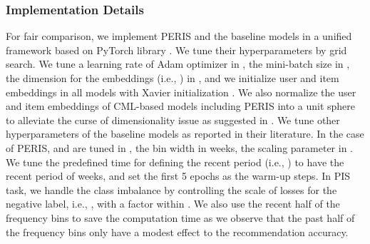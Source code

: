 \documentclass[sigconf]{acmart}
\newcommand{\MD}{{\small\textsf{PERIS}}}
\begin{document}
\subsubsection{\textbf{Implementation Details}}
For fair comparison, we implement \MD{} and the baseline models in a unified framework based on PyTorch library \cite{paszke2019pytorch}. We tune their hyperparameters by grid search. We tune a learning rate of Adam optimizer \cite{kingma2014adam} in , the mini-batch size in , the dimension for the embeddings (i.e., ) in , and we initialize user and item embeddings in all models with Xavier initialization \cite{glorot2010understanding}. We also normalize the user and item embeddings of CML-based models including \MD{} into a unit sphere to alleviate the curse of dimensionality issue as suggested in \cite{bordes2013translating,hsieh2017collaborative}. We tune other hyperparameters of the baseline models as reported in their literature. 
In the case of \MD{},  and  are tuned in , the bin width  in  weeks, the scaling parameter  in . We tune the predefined time for defining the recent period (i.e., ) to have the recent period of  weeks, and set the first 5 epochs as the warm-up steps. 
In PIS task, we handle the class imbalance by controlling the scale of losses for the negative label, i.e., , with a factor  within .
We also use the recent half of the frequency bins  to save the computation time as we observe that the past half of the frequency bins only have a modest effect to the recommendation accuracy.
\end{document}
